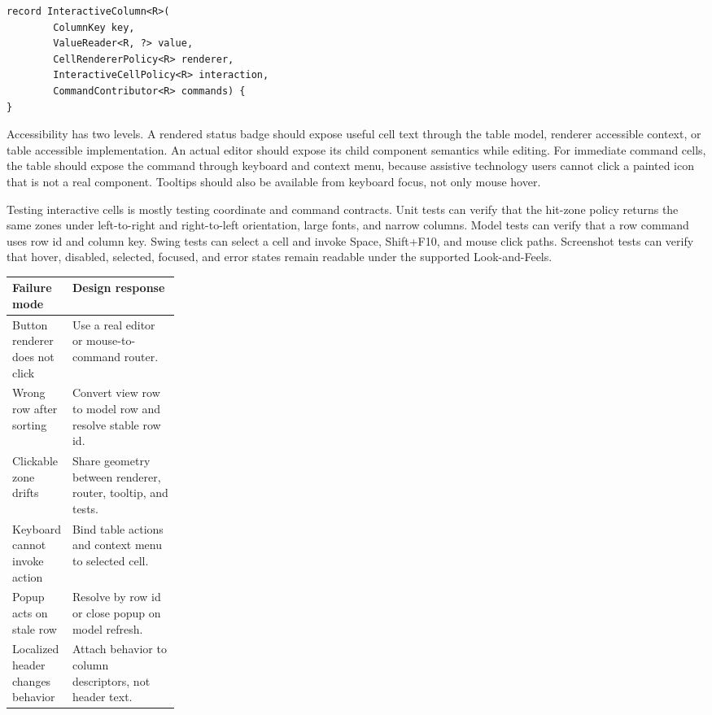 \begin{lstlisting}[caption={Descriptor-backed columns provide command metadata to cells.}]
record InteractiveColumn<R>(
        ColumnKey key,
        ValueReader<R, ?> value,
        CellRendererPolicy<R> renderer,
        InteractiveCellPolicy<R> interaction,
        CommandContributor<R> commands) {
}
\end{lstlisting}

Accessibility has two levels. A rendered status badge should expose useful cell
text through the table model, renderer accessible context, or table accessible
implementation. An actual editor should expose its child component semantics
while editing. For immediate command cells, the table should expose the command
through keyboard and context menu, because assistive technology users cannot
click a painted icon that is not a real component. Tooltips should also be
available from keyboard focus, not only mouse hover.

Testing interactive cells is mostly testing coordinate and command contracts.
Unit tests can verify that the hit-zone policy returns the same zones under
left-to-right and right-to-left orientation, large fonts, and narrow columns.
Model tests can verify that a row command uses row id and column key. Swing tests
can select a cell and invoke Space, Shift+F10, and mouse click paths. Screenshot
tests can verify that hover, disabled, selected, focused, and error states remain
readable under the supported Look-and-Feels.

\begin{tabularx}{0.96\linewidth}{@{}p{0.24\linewidth}X@{}}
\toprule
Failure mode & Design response\\
\midrule
Button renderer does not click & Use a real editor or mouse-to-command router.\\
Wrong row after sorting & Convert view row to model row and resolve stable row id.\\
Clickable zone drifts & Share geometry between renderer, router, tooltip, and tests.\\
Keyboard cannot invoke action & Bind table actions and context menu to selected cell.\\
Popup acts on stale row & Resolve by row id or close popup on model refresh.\\
Localized header changes behavior & Attach behavior to column descriptors, not header text.\\
\bottomrule
\end{tabularx}

